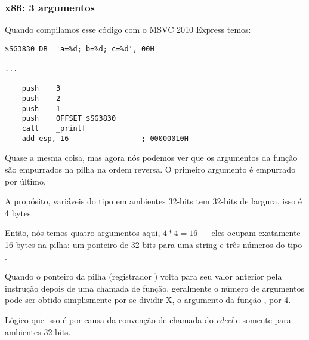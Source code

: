\subsubsection{x86: 3 argumentos}


Quando compilamos esse código com o MSVC 2010 Express temos:

\begin{lstlisting}[style=customasmx86]
$SG3830	DB	'a=%d; b=%d; c=%d', 00H

...

	push	3
	push	2
	push	1
	push	OFFSET $SG3830
	call	_printf
	add	esp, 16					; 00000010H
\end{lstlisting}

Quase a mesma coisa, mas agora nós podemos ver que os argumentos da função \printf são empurrados na pilha na ordem reversa. O primeiro argumento é empurrado por último.

A propósito, variáveis do tipo \Tint em ambientes 32-bits tem 32-bits de largura, isso é 4 bytes.

Então, nós temos quatro argumentos aqui, $4*4=16$ --- eles ocupam exatamente 16 bytes na pilha: um ponteiro de 32-bits para uma string e três números do tipo \Tint.

Quando o ponteiro da pilha (registrador \ESP) volta para seu valor anterior pela instrução  depois de uma chamada de função,
geralmente o número de argumentos pode ser obtido simplismente por se dividir X, o argumento da função \ADD, por 4.

Lógico que isso é por causa da convenção de chamada do \emph{cdecl} e somente para ambientes 32-bits.


